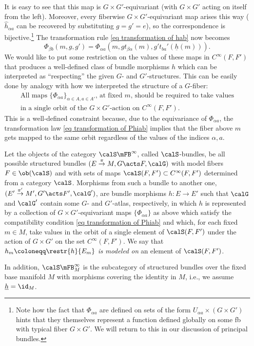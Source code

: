 It is easy to see that this map is $G\times G'$-equivariant (with $G\times G'$ acting on itself from the left). Moreover, every fiberwise $G\times G'$-equivariant map arises this way ($\hat{h}_{\alpha a}$ can be recovered by substituting $g=g'=e$), so the correspondence is bijective.\footnote{Note how the fact that $\varPhi_{\alpha a}$ are defined on sets of the form $U_{\alpha a}\times (G\times G')$ hints that they themselves represent a function defined globally on some \gls{fb} with typical fiber $G\times G'$. We will return to this in our discussion of principal bundles.} The transformation rule \eqref{eq transformation of hab} now becomes
\[\boxed{\varPhi_{\beta b}(m,g,g')=\varPhi_{\alpha a}\left(m,gt_{\beta\alpha}(m),g't_{ba}'(\underline{h}(m))\right).}\label{eq transformation of Phiab}\]
We would like to put some restriction on the values of these maps in $C^\infty(F,F')$ that produces a well-defined class of bundle morphisms $h$ which can be interpreted as ``respecting'' the given $G$- and $G'$-structures. This can be easily done by analogy with how we interpreted the structure of a $G$-fiber:
\begin{equation*}
    \begin{gathered}
        \text{All maps }\{\varPhi_{\alpha a}\}_{\alpha\in A,a\in A'}\text{, at fixed }m\text{, should be required to take values}\\
        \text{in a single orbit of the }G\times G'\text{-action on }C^\infty(F,F').
    \end{gathered}
\end{equation*}
This is a well-defined constraint because, due to the equivariance of $\varPhi_{\alpha a}$, the transformation law \eqref{eq transformation of Phiab} implies that the fiber above $m$ gets mapped to the same orbit regardless of the values of the indices $\alpha,a$.

\begin{defn}\label{def S-bundle}
    Let the objects of the category $\calS\mFB^\infty$, called $\calS$-bundles, be all possible structured bundles $(E\overset{\pi}{\to}M,G\acts F,\calG)$ with model fibers $F\in\ob(\calS)$ and with sets of maps $\calS(F,F')\subset C^\infty(F,F')$ determined from a category $\calS$. Morphisms from such a bundle to another one, $(E'\overset{\pi'}{\to}M',G'\acts F',\calG')$, are bundle morphisms $h:E\to E'$ such that $\calG$ and $\calG'$ contain some $G$- and $G'$-atlas, respectively, in which $h$ is represented by a collection of $G\times G'$-equivariant maps $\{\varPhi_{\alpha a}\}$ as above which satisfy the compatibility condition \eqref{eq transformation of Phiab} and which, for each fixed $m\in M$, take values in the orbit of a single element of $\calS(F,F')$ under the action of $G\times G'$ on the set $C^\infty(F,F')$. We say that $h_m\coloneqq \restr{h}{E_m}$ \emph{is modeled on} an element of $\calS(F,F')$.

    In addition, ${\calS\mFB}_M^\infty$ is the subcategory of structured bundles over the fixed base manifold $M$ with morphisms covering the identity in $M$, i.e., we assume $\underline{h}=\id_M$.
\end{defn}

